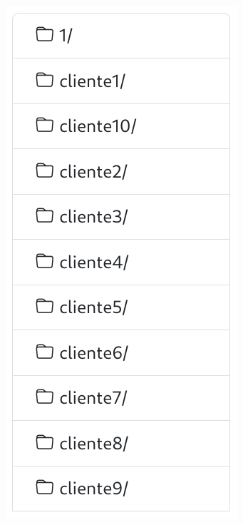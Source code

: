 \documentclass{\ClassPath/viu-tfm-template}
\begin{document}
{
\begin{minipage}{0.3\linewidth}
    \includegraphics[width=0.9\linewidth]{img/tree1.png}
\end{minipage}
\hfill
\begin{minipage}{0.3\linewidth}

\end{minipage}}
\end{document}
